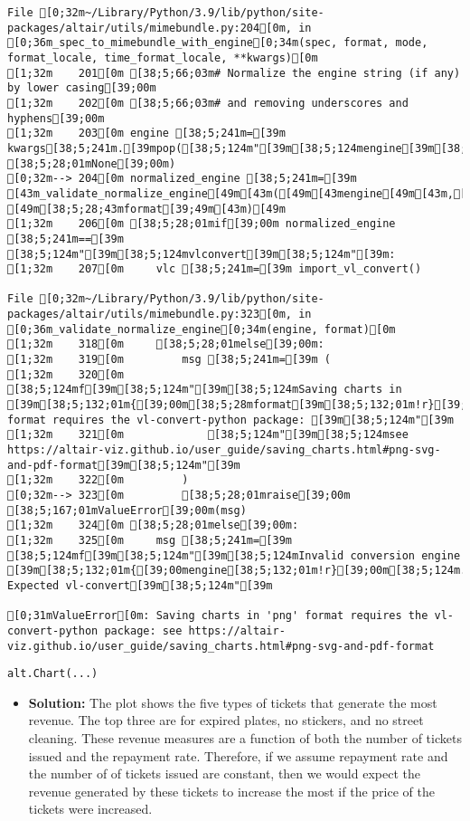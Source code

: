 \documentclass[
  letterpaper,
  DIV=11,
  numbers=noendperiod]{scrartcl}
\providecommand{\tightlist}{%
  \setlength{\itemsep}{0pt}\setlength{\parskip}{0pt}}\usepackage{longtable,booktabs,array}
\begin{document}
\begin{verbatim}
File [0;32m~/Library/Python/3.9/lib/python/site-packages/altair/utils/mimebundle.py:204[0m, in [0;36m_spec_to_mimebundle_with_engine[0;34m(spec, format, mode, format_locale, time_format_locale, **kwargs)[0m
[1;32m    201[0m [38;5;66;03m# Normalize the engine string (if any) by lower casing[39;00m
[1;32m    202[0m [38;5;66;03m# and removing underscores and hyphens[39;00m
[1;32m    203[0m engine [38;5;241m=[39m kwargs[38;5;241m.[39mpop([38;5;124m"[39m[38;5;124mengine[39m[38;5;124m"[39m, [38;5;28;01mNone[39;00m)
[0;32m--> 204[0m normalized_engine [38;5;241m=[39m [43m_validate_normalize_engine[49m[43m([49m[43mengine[49m[43m,[49m[43m [49m[38;5;28;43mformat[39;49m[43m)[49m
[1;32m    206[0m [38;5;28;01mif[39;00m normalized_engine [38;5;241m==[39m [38;5;124m"[39m[38;5;124mvlconvert[39m[38;5;124m"[39m:
[1;32m    207[0m     vlc [38;5;241m=[39m import_vl_convert()

File [0;32m~/Library/Python/3.9/lib/python/site-packages/altair/utils/mimebundle.py:323[0m, in [0;36m_validate_normalize_engine[0;34m(engine, format)[0m
[1;32m    318[0m     [38;5;28;01melse[39;00m:
[1;32m    319[0m         msg [38;5;241m=[39m (
[1;32m    320[0m             [38;5;124mf[39m[38;5;124m"[39m[38;5;124mSaving charts in [39m[38;5;132;01m{[39;00m[38;5;28mformat[39m[38;5;132;01m!r}[39;00m[38;5;124m format requires the vl-convert-python package: [39m[38;5;124m"[39m
[1;32m    321[0m             [38;5;124m"[39m[38;5;124msee https://altair-viz.github.io/user_guide/saving_charts.html#png-svg-and-pdf-format[39m[38;5;124m"[39m
[1;32m    322[0m         )
[0;32m--> 323[0m         [38;5;28;01mraise[39;00m [38;5;167;01mValueError[39;00m(msg)
[1;32m    324[0m [38;5;28;01melse[39;00m:
[1;32m    325[0m     msg [38;5;241m=[39m [38;5;124mf[39m[38;5;124m"[39m[38;5;124mInvalid conversion engine [39m[38;5;132;01m{[39;00mengine[38;5;132;01m!r}[39;00m[38;5;124m. Expected vl-convert[39m[38;5;124m"[39m

[0;31mValueError[0m: Saving charts in 'png' format requires the vl-convert-python package: see https://altair-viz.github.io/user_guide/saving_charts.html#png-svg-and-pdf-format
\end{verbatim}

\begin{verbatim}
alt.Chart(...)
\end{verbatim}

\begin{itemize}
\tightlist
\item
  \textbf{Solution:} The plot shows the five types of tickets that
  generate the most revenue. The top three are for expired plates, no
  stickers, and no street cleaning. These revenue measures are a
  function of both the number of tickets issued and the repayment rate.
  Therefore, if we assume repayment rate and the number of of tickets
  issued are constant, then we would expect the revenue generated by
  these tickets to increase the most if the price of the tickets were
  increased.
\end{itemize}
\end{document}
